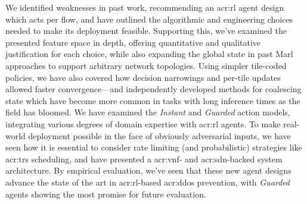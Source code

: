 We identified weaknesses in past work, recommending an \gls{acr:rl} agent design which acts per flow, and have outlined the algorithmic and engineering choices needed to make its deployment feasible.
Supporting this, we've examined the presented feature space in depth, offering quantitative and qualitative justification for each choice, while also expanding the global state in past Marl approaches to support arbitrary network topologies.
Using simpler tile-coded policies, we have also covered how decision narrowings and per-tile updates allowed faster convergence---and independently developed methods for coalescing state which have become more common in tasks with long inference times as the field has bloomed.
We have examined the \emph{Instant} and \emph{Guarded} action models, integrating various degrees of domain expertise with \gls{acr:rl} agents.
To make real-world deployment possible in the face of obviously adversarial inputs, we have seen how it is essential to consider rate limiting (and probabilistic) strategies like \gls{acr:trs} scheduling, and have presented a \gls{acr:vnf}- and \gls{acr:sdn}-backed system architecture.
By empirical evaluation, we've seen that these new agent designs advance the state of the art in \gls{acr:rl}-based \gls{acr:ddos} prevention, with \emph{Guarded} agents showing the most promise for future evaluation.



